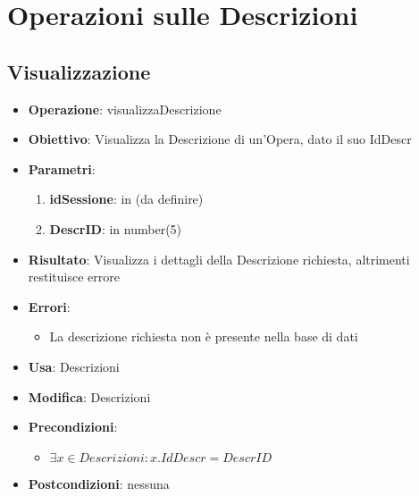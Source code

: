 \section{Operazioni sulle Descrizioni}

\subsection{Visualizzazione}
\begin{itemize}
	\item \textbf{Operazione}: visualizzaDescrizione
	\item \textbf{Obiettivo}: Visualizza la Descrizione di un'Opera, dato il suo IdDescr
	\item \textbf{Parametri}:
	\begin{enumerate}
		\item \textbf{idSessione}: in (da definire)
		\item \textbf{DescrID}: in number(5)
	\end{enumerate}
	\item \textbf{Risultato}: Visualizza i dettagli della Descrizione richiesta, altrimenti restituisce errore
	\item \textbf{Errori}: 
	\begin{itemize}
		\item La descrizione richiesta non è presente nella base di dati
	\end{itemize}
	\item \textbf{Usa}: Descrizioni
	\item \textbf{Modifica}: Descrizioni
	\item \textbf{Precondizioni}:
	\begin{itemize}
		\item $\exists x \in Descrizioni : x.IdDescr = DescrID$
	\end{itemize}
	\item \textbf{Postcondizioni}: nessuna
\end{itemize}

